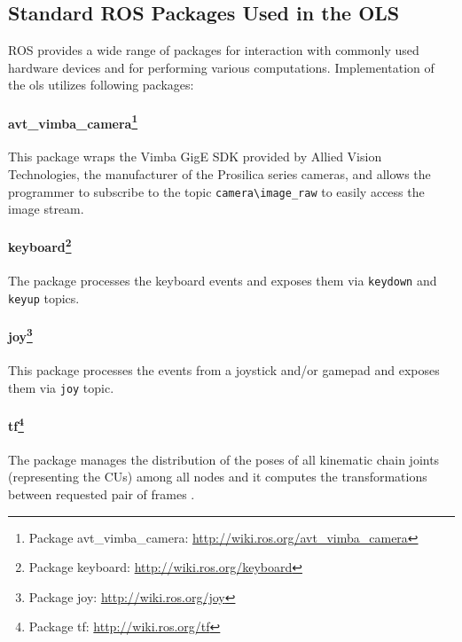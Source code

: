 	
\subsection{Standard ROS Packages Used in the OLS} \label{txt:standard_ros_packages}

ROS provides a wide range of packages for interaction with commonly used hardware devices and for performing various computations. Implementation of the \gls{ols} utilizes following packages:

\paragraph{avt\_vimba\_camera\protect\footnote{Package avt\_vimba\_camera: \url{http://wiki.ros.org/avt_vimba_camera}}}
This package wraps the Vimba GigE SDK provided by Allied Vision Technologies, the manufacturer of the Prosilica series cameras, and allows the programmer to subscribe to the topic \texttt{camera\textbackslash image\_raw} to easily access the image stream.

\paragraph{keyboard\protect\footnote{Package keyboard: \url{http://wiki.ros.org/keyboard}}}
The package processes the keyboard events and exposes them via \texttt{keydown} and \texttt{keyup} topics.

\paragraph{joy\protect\footnote{Package joy: \url{http://wiki.ros.org/joy}}}
This package processes the events from a joystick and/or gamepad and exposes them via \texttt{joy} topic.

\paragraph{tf\protect\footnote{Package tf: \url{http://wiki.ros.org/tf}}}
The package manages the distribution of the poses of all kinematic chain joints (representing the CUs) among all nodes and it computes the transformations between requested pair of frames \cite{tf}.

